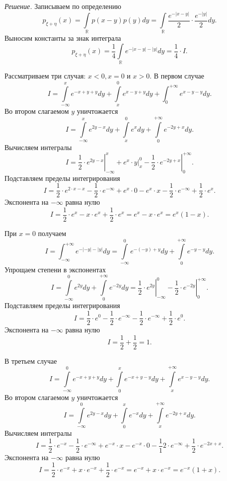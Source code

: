 \textit{Решение.} Записываем по определению
$$p_{ \xi + \eta } \left( x \right) =
\int \limits_{ \mathbb{R}} p \left( x-y \right) p \left( y \right) dy =
\int \limits_{ \mathbb{R}} \frac{e^{- \left| x-y \right| }}{2} \cdot \frac{e^{- \left| y \right| }}{2} dy.$$
Выносим константы за знак интеграла
$$p_{ \xi + \eta } \left( x \right) =
\frac{1}{4} \int \limits_{ \mathbb{R}} e^{- \left| x-y \right| - \left| y \right| } dy =
\frac{1}{4} \cdot I.$$

Рассматриваем три случая: $x < 0, x = 0$ и $x > 0$.
В первом случае
$$I =
\int \limits_{- \infty }^x e^{-x+y+y} dy + \int \limits_x^0 e^{x-y+y} dy + \int_0^{+ \infty } e^{x-y-y} dy.$$
Во втором слагаемом $y$ уничтожается
$$I =
\int \limits_{- \infty }^x e^{2y-x} dy + \int \limits_x^0 e^x dy + \int \limits_0^{+ \infty } e^{-2y+x} dy.$$
Вычисляем интегралы
$$I =
\left. \frac{1}{2} \cdot e^{2y-x} \right|_{- \infty }^x + \left. e^x \cdot y \right|_x^0 - \left. \frac{1}{2} \cdot e^{-2y+x} \right|_0^{+ \infty }.$$
Подставляем пределы интегрирования
$$I =
\frac{1}{2} \cdot e^{2 \cdot x - x} - \frac{1}{2} \cdot e^{- \infty } + e^x \cdot 0 - e^x \cdot x - \frac{1}{2} \cdot e^{- \infty } + \frac{1}{2} \cdot e^x.$$
Экспонента на $- \infty $ равна нулю
$$I =
\frac{1}{2} \cdot e^x - x \cdot e^x + \frac{1}{2} \cdot e^x =
e^x - x \cdot e^x =
e^x \left( 1 - x \right).$$

При $x = 0$ получаем
$$I =
\int_{- \infty }^{+ \infty } e^{- \left| -y \right| - \left| y \right| } dy =
\int \limits_{- \infty }^0 e^{- \left( -y \right) + y} dy + \int \limits_0^{+ \infty } e^{-y-y} dy.$$
Упрощаем степени в экспонентах
$$I =
\int \limits_{- \infty }^0 e^{2y} dy + \int \limits_0^{+ \infty } e^{-2y} dy =
\left. \frac{1}{2} \cdot e^{2y} \right|_{- \infty }^0 - \left. \frac{1}{2} \cdot e^{-2y} \right|_0^{+ \infty }.$$
Подставляем пределы интегрирования
$$I =
\frac{1}{2} \cdot e^0 - \frac{1}{2} \cdot e^{- \infty } - \frac{1}{2} \cdot e^{- \infty } + \frac{1}{2} \cdot e^0.$$
Экспонента на $- \infty $ равна нулю
$$I =
\frac{1}{2} + \frac{1}{2} =
1.$$

В третьем случае
$$I =
\int \limits_{- \infty }^0 e^{-x+y+y} dy + \int \limits_0^x e^{-x+y-y} dy + \int \limits_x^{+ \infty } e^{x-y-y} dy.$$
Во втором слагаемом $y$ уничтожается
$$I =
\int \limits_{- \infty }^0 e^{2y-x} dy + \int \limits_0^x e^{-x} dy + \int \limits_x^{+ \infty } e^{-2y+x} dy.$$
Вычисляем интегралы
$$I =
\frac{1}{2} \cdot e^{-x} - \frac{1}{2} \cdot e^{- \infty } + e^{-x} \cdot x - e^{-x} \cdot 0 - \frac1{1}{2} \cdot e^{- \infty } + \frac{1}{2} \cdot e^{-2x+x}.$$
Экспонента на $- \infty $ равна нулю
$$I =
\frac{1}{2} \cdot e^{-x} + x \cdot e^{-x} + \frac{1}{2} \cdot e^{-x} =
e^{-x} + x \cdot e^{-x} =
e^{-x} \left( 1+x \right).$$

